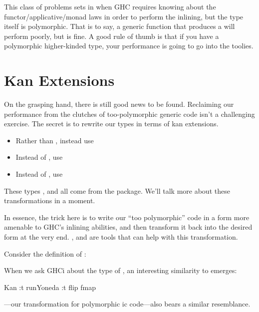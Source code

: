 \documentclass[book.tex]{subfiles}
\begin{document}
This class of problems sets in when GHC requires knowing about the
functor/applicative/monad laws in order to perform the inlining, but the type
itself is polymorphic. That is to say, a generic function that produces a
 will perform poorly, but  is fine. A good rule of
thumb is that if you have a polymorphic higher-kinded type, your performance is
going to go into the toolies.


\section{Kan Extensions}


On the grasping hand, there is still good news to be found. Reclaiming our
performance from the clutches of too-polymorphic generic code isn't a
challenging exercise. The secret is to rewrite our types in terms of kan
extensions.

\begin{itemize}
  \item{Rather than , instead use }
  \item{Instead of , use }
  \item{Instead of , use }
\end{itemize}

These types ,  and  all come from the
\cite{kan-extensions} package. We'll talk more about these
transformations in a moment.

In essence, the trick here is to write our ``too polymorphic'' code in a form
more amenable to GHC's inlining abilities, and then transform it back into the
desired form at the very end. ,  and  are
tools that can help with this transformation.

Consider the definition of :


When we ask GHCi about the type of , an interesting similarity to
 emerges:

\begin{dorepl}{Kan}
:t runYoneda
:t flip fmap
\end{dorepl}

---our transformation for polymorphic ic code---also
bears a similar resemblance.
\end{document}

